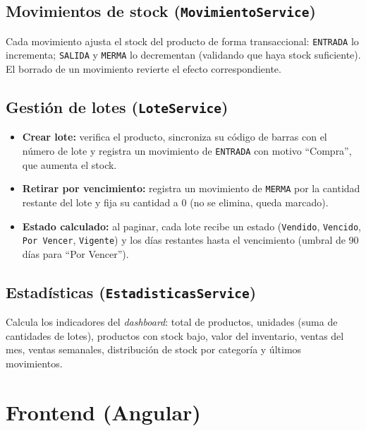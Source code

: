 \documentclass[11pt,a4paper]{article}
\begin{document}
\subsection{Movimientos de stock (\texttt{MovimientoService})}

Cada movimiento ajusta el stock del producto de forma transaccional:
\texttt{ENTRADA} lo incrementa; \texttt{SALIDA} y \texttt{MERMA} lo
decrementan (validando que haya stock suficiente). El borrado de un movimiento
revierte el efecto correspondiente.

\subsection{Gestión de lotes (\texttt{LoteService})}

\begin{itemize}[noitemsep]
    \item \textbf{Crear lote:} verifica el producto, sincroniza su código de
          barras con el número de lote y registra un movimiento de
          \texttt{ENTRADA} con motivo ``Compra'', que aumenta el stock.
    \item \textbf{Retirar por vencimiento:} registra un movimiento de
          \texttt{MERMA} por la cantidad restante del lote y fija su cantidad a
          0 (no se elimina, queda marcado).
    \item \textbf{Estado calculado:} al paginar, cada lote recibe un estado
          (\texttt{Vendido}, \texttt{Vencido}, \texttt{Por Vencer},
          \texttt{Vigente}) y los días restantes hasta el vencimiento
          (umbral de 90 días para ``Por Vencer'').
\end{itemize}

\subsection{Estadísticas (\texttt{EstadisticasService})}

Calcula los indicadores del \emph{dashboard}: total de productos, unidades
(suma de cantidades de lotes), productos con stock bajo, valor del inventario,
ventas del mes, ventas semanales, distribución de stock por categoría y
últimos movimientos.

\section{Frontend (Angular)}
\end{document}
